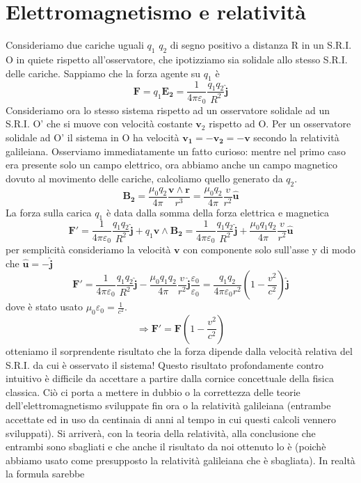 \documentclass[10pt,a4paper]{article}
\begin{document}
\section{Elettromagnetismo e relatività}
Consideriamo due cariche uguali \(q_1\) \(q_2\) di segno positivo a distanza R in un S.R.I. O in quiete rispetto all'osservatore, che ipotizziamo sia solidale allo stesso S.R.I. delle cariche. Sappiamo che la forza agente su \(q_1\) è
\[\mathbf{F}=q_1 \mathbf{E_2}= \frac{1}{4\pi\varepsilon_0}\frac{q_1q_2}{R^2}\mathbf{\hat{j}}\]
Consideriamo ora lo stesso sistema rispetto ad un osservatore solidale ad un S.R.I. O' che si muove con velocità costante \(\mathbf{v}_2\) rispetto ad O. Per un osservatore solidale ad O' il sistema in O ha velocità \(\mathbf{v_1}=-\mathbf{v_2}= -\mathbf{v}\) secondo la relatività galileiana. Osserviamo immediatamente un fatto curioso: mentre nel primo caso era presente solo un campo elettrico, ora abbiamo anche un campo magnetico dovuto al movimento delle cariche, calcoliamo quello generato da \(q_2\). 
\[\mathbf{B_2}= \frac{\mu_0q_2}{4\pi}\frac{\mathbf{v}\wedge\mathbf{r}}{r^3}=\frac{\mu_0q_2}{4\pi}\frac{v}{r^2}\mathbf{\hat{u}}\]
La forza sulla carica \(q_1\) è data dalla somma della forza elettrica e magnetica
\[\mathbf{F'}= \frac{1}{4\pi\varepsilon_0}\frac{q_1q_2}{R^2}\mathbf{\hat{j}}+q_1\mathbf{v}\wedge\mathbf{B_2}=\frac{1}{4\pi\varepsilon_0}\frac{q_1q_2}{R^2}\mathbf{\hat{j}}+\frac{\mu_0q_1q_2}{4\pi}\frac{v}{r^2}\mathbf{\hat{u}}\]
per semplicità consideriamo la velocità \(\mathbf{v}\) con componente solo sull'asse y di modo che \(\mathbf{\hat{u}}= - \mathbf{\hat{j}}\)
\[\mathbf{F'}= \frac{1}{4\pi\varepsilon_0}\frac{q_1q_2}{R^2}\mathbf{\hat{j}}-\frac{\mu_0q_1q_2}{4\pi}\frac{v}{r^2}\mathbf{\hat{j}}\frac{\varepsilon_0}{\varepsilon_0}=\frac{q_1q_2}{4\pi\varepsilon_0 r^2}\left(1-\frac{v^2}{c^2}\right)\mathbf{\hat{j}}\]
dove è stato usato \(\mu_0\varepsilon_0 = \frac{1}{c^2}\). 
\[\Rightarrow \mathbf{F'}=\mathbf{F}\left(1-\frac{v^2}{c^2}\right)\]
otteniamo il sorprendente risultato che la forza dipende dalla velocità relativa del S.R.I. da cui è osservato il sistema! Questo risultato profondamente contro intuitivo è difficile da accettare a partire dalla cornice concettuale della fisica classica. Ciò ci porta a mettere in dubbio o la correttezza delle teorie dell'elettromagnetismo sviluppate fin ora o la relatività galileiana (entrambe accettate ed in uso da centinaia di anni al tempo in cui questi calcoli vennero sviluppati). Si arriverà, con la teoria della relatività, alla conclusione che entrambi sono sbagliati e che anche il risultato da noi ottenuto lo è (poichè abbiamo usato come presupposto la relatività galileiana che è sbagliata). In realtà la formula sarebbe
\end{document}
